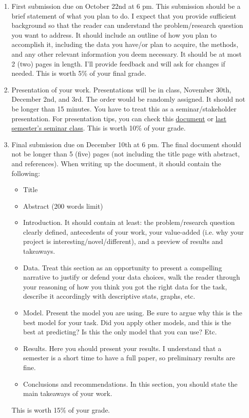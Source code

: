 \documentclass[12pt,onecolumn]{article}
\begin{document}
\begin{enumerate}
\item First submission due on October 22nd at 6 pm. This submission should be a brief statement of what you plan to do.  I expect that you provide sufficient background so that the reader can understand the problem/research question you want to address. It should include an outline of how you plan to accomplish it, including the data you have/or plan to acquire, the methods, and any other relevant information you deem necessary.
It should be at most 2 (two) pages in length. I'll provide feedback and will ask for changes if needed. This is worth 5\% of your final grade.

\item Presentation of your work. Presentations will be in class, November 30th, December 2nd, and 3rd. The order would be randomly assigned. It should not be longer than 15 minutes. You have to treat this as a seminar/stakeholder presentation. For presentation tips, you can check this \href{https://ignaciomsarmiento.github.io/teaching/seminar/Tips_Presentation_PEG.pdf}{document} or  \href{https://ignaciomsarmiento.github.io/teaching/Tesis.html}{last semester's seminar class}. This is worth 10\% of your grade.


\item Final  submission  due on December 10th at 6 pm. The final document should not be longer than 5 (five) pages (not including the title page with abstract, and references). When writing up the document, it should contain the following:
\begin{itemize}
  \item Title
  \item Abstract (200 words limit)
  \item Introduction. It should contain at least: the problem/research question clearly defined,  antecedents of your work, your value-added (i.e. why your project is interesting/novel/different), and a preview of  results and takeaways.
  \item Data. Treat this section as an opportunity to present a compelling narrative to justify or defend your data choices, walk the reader through your reasoning of how you think you got the right data for the task, describe it accordingly with descriptive stats, graphs, etc.
  \item Model. Present the model you are using.  Be sure to argue why this is the best model for your task. Did you apply other models, and this is the best at predicting? Is this the only model that you can use? Etc. 
  \item Results. Here you should present your results. I understand that a semester is a short time to have a full paper, so preliminary results are fine. 
  \item Conclusions and recommendations. In this section, you should state the main takeaways of your work.
\end{itemize}
This is worth 15\% of your grade.
\end{enumerate}
\end{document}
